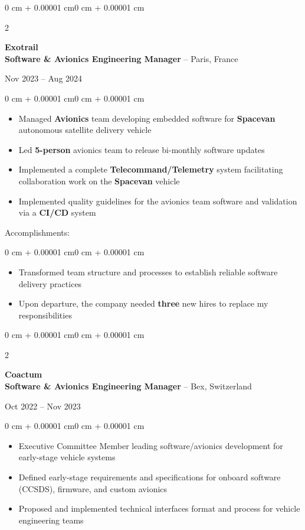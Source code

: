 \documentclass[10pt, letterpaper]{article}
\newenvironment{highlights}{
    \begin{itemize}[
        topsep=0.10 cm,
        parsep=0.10 cm,
        partopsep=0pt,
        itemsep=0pt,
        leftmargin=1.5 cm
    ]
}{
    \end{itemize}
}
\newenvironment{highlightsforbulletentries}{
    \begin{itemize}[
        topsep=0.10 cm,
        parsep=0.10 cm,
        partopsep=0pt,
        itemsep=0pt,
        leftmargin=1.5 cm
    ]
}{
    \end{itemize}
}
\newenvironment{onecolentry}{
    \begin{adjustwidth}{0 cm + 0.00001 cm}{0 cm + 0.00001 cm}
}{
    \end{adjustwidth}
}
\newenvironment{twocolentry}[2][]{
    \onecolentry
    \def\secondColumn{#2}
    \setcolumnwidth{\fill, 4.5 cm}
    \begin{paracol}{2}
}{
    \switchcolumn \raggedleft \secondColumn
    \end{paracol}
    \endonecolentry
}
\begin{document}
    \begin{twocolentry}{Nov 2023 -- Aug 2024}
        \textbf{Exotrail} \\
        \textbf{Software \& Avionics Engineering Manager} -- Paris, France
    \end{twocolentry}
    \begin{onecolentry}
        \begin{highlights}
            \item Managed \textbf{Avionics} team developing embedded software for \textbf{Spacevan} autonomous satellite delivery vehicle
            \item Led \textbf{5-person} avionics team to release bi-monthly software updates
            \item Implemented a complete \textbf{Telecommand/Telemetry} system facilitating collaboration work on the \textbf{Spacevan} vehicle
            \item Implemented quality guidelines for the avionics team software and validation via a \textbf{CI/CD} system
        \end{highlights}
    \end{onecolentry}

    Accomplishments:
    \begin{onecolentry}
        \begin{highlightsforbulletentries}
            \item Transformed team structure and processes to establish reliable software delivery practices
            \item Upon departure, the company needed \textbf{three} new hires to replace my responsibilities
        \end{highlightsforbulletentries}
    \end{onecolentry}

    \vspace{0.5cm}

    \begin{twocolentry}{Oct 2022 -- Nov 2023}
        \textbf{Coactum} \\
        \textbf{Software \& Avionics Engineering Manager} -- Bex, Switzerland
    \end{twocolentry}
    \begin{onecolentry}
        \begin{highlights}
            \item Executive Committee Member leading software/avionics development for early-stage vehicle systems
            \item Defined early-stage requirements and specifications for onboard software (CCSDS), firmware, and custom avionics
            \item Proposed and implemented technical interfaces format and process for vehicle engineering teams
        \end{highlights}
    \end{onecolentry}
\end{document}
